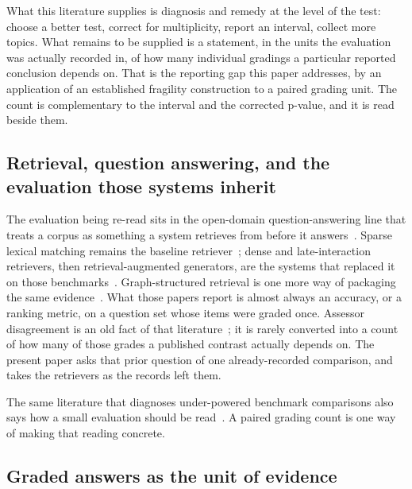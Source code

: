 What this literature supplies is diagnosis and remedy at the level of the test:
choose a better test, correct for multiplicity, report an interval, collect more
topics. What remains to be supplied is a statement, in the units the evaluation
was actually recorded in, of how many individual gradings a particular reported
conclusion depends on. That is the reporting gap this paper addresses, by an
application of an established fragility construction to a paired grading unit.
The count is complementary to the interval and the corrected p-value, and it is
read beside them.

\subsection{Retrieval, question answering, and the evaluation those systems inherit}

The evaluation being re-read sits in the open-domain question-answering line
that treats a corpus as something a system retrieves from before it
answers~\cite{chen2017reading,rajpurkar2016squad,kwiatkowski2019nq,
joshi2017triviaqa,yang2018hotpotqa}. Sparse lexical matching remains the
baseline retriever~\cite{robertson2009bm25}; dense and late-interaction
retrievers, then retrieval-augmented generators, are the systems that replaced
it on those
benchmarks~\cite{lee2019latent,karpukhin2020dpr,khattab2020colbert,
guu2020realm,izacard2021fid,lewis2020retrieval,izacard2022atlas,
thakur2021beir}. Graph-structured retrieval is one more way of packaging the
same evidence~\cite{edge2024local}. What those papers report is almost always an
accuracy, or a ranking metric, on a question set whose items were graded once.
Assessor disagreement is an old fact of that
literature~\cite{voorhees2000variations,bailey2008relevance,artstein2008inter};
it is rarely converted into a count of how many of those grades a published
contrast actually depends on. The present paper asks that prior question of one
already-recorded comparison, and takes the retrievers as the records left them.

The same literature that diagnoses under-powered benchmark comparisons also
says how a small evaluation should be
read~\cite{cohen1992power,button2013power,card2020little,munafo2017manifesto,
head2015phacking,openscience2015repro,goodman2016mean,pineau2021improving,
wilkinson2016fair}. A paired grading count is one way of making that reading
concrete.

\subsection{Graded answers as the unit of evidence}

